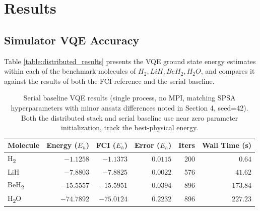 
\section{Results}
\subsection{Simulator VQE Accuracy}
Table \ref{table:distributed_results} presents the VQE ground state energy estimates within each of the 
benchmark molecules of $H_2, LiH, BeH_2, H_{2}O$, and compares it against the results of both the FCI reference and the serial baseline.

\begin{table}[htbp]
\centering
\renewcommand{\arraystretch}{1.2}
\caption{Distributed stack VQE results (P=2 MPI ranks, statevector simulator, CPU only, seed=42). The best physical energy is the lowest energy observed at/above the molecules FCI reference.}
\label{table:distributed_results}
\end{table} 

\begin{table}[htbp]
\centering
\renewcommand{\arraystretch}{1.2}
\caption{Serial baseline VQE results (single process, no MPI, matching SPSA hyperparameters with minor ansatz differences noted in Section 4, seed=42). Both the distributed stack and serial baseline use near zero parameter initialization, track the best-physical energy.}
\label{table:serial_baseline}
\begin{tabular}{|l|r|r|r|r|r|}
\hline
\textbf{Molecule} & \textbf{Energy ($E_h$)} & \textbf{FCI ($E_h$)} & \textbf{Error ($E_h$)} & \textbf{Iters} & \textbf{Wall Time (s)} \\ \hline
H\textsubscript{2} & $-1.1258$ & $-1.1373$ & $0.0115$ & 200 & $0.64$  \\ \hline
LiH & $-7.8803$ & $-7.8825$ & $0.0022$ & 576 & $41.62$ \\ \hline
BeH\textsubscript{2} & $-15.5557$ & $-15.5951$ & $0.0394$ & 896 & $173.84$ \\ \hline
H\textsubscript{2}O & $-74.7892$ & $-75.0124$ & $0.2232$ & 896 & $227.23$ \\ \hline
\end{tabular}
\end{table}

